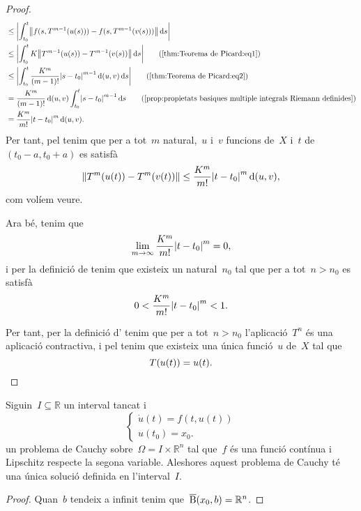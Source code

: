 \documentclass[../../main.tex]{subfiles}
\begin{document}
\begin{theorem}
\begin{proof}
\begin{align*}
                &\leq\abs{\int_{t_{0}}^{t}\norm{f(s,T^{m-1}(u(s)))-f(s,T^{m-1}(v(s)))}\diff s}\\
                &\leq\abs{\int_{t_{0}}^{t}K\norm{T^{m-1}(u(s))-T^{m-1}(v(s))}\diff s}\tag{\ref{thm:Teorema de Picard:eq1}}\\
                &\leq\abs{\int_{t_{0}}^{t}\frac{K^{m}}{(m-1)!}\abs{s-t_{0}}^{m-1}\distancia(u,v)\diff s}\tag{\ref{thm:Teorema de Picard:eq2}}\\
                &=\frac{K^{m}}{(m-1)!}\distancia(u,v)\int_{t_{0}}^{t}\abs{s-t_{0}}^{m-1}\diff s\tag{\ref{prop:propietats basiques multiple integrals Riemann definides}}\\
                &=\frac{K^{m}}{m!}\abs{t-t_{0}}^{m}\distancia(u,v).%
            \end{align*}
            Per tant, pel  tenim que per a tot~\(m\) natural,~\(u\) i~\(v\) funcions de~\(X\) i~\(t\) de~\((t_{0}-a,t_{0}+a)\) es satisfà
            \[
                \norm{T^{m}(u(t))-T^{m}(v(t))}\leq\frac{K^{m}}{m!}\abs{t-t_{0}}^{m}\distancia(u,v),
            \]
            com volíem veure.

            Ara bé, tenim que
            \[
                \lim_{m\to\infty}\frac{K^{m}}{m!}\abs{t-t_{0}}^{m}=0,
            \]%
            i per la definició de  tenim que existeix un natural~\(n_{0}\) tal que per a tot~\(n>n_{0}\) es satisfà
            \[
                0<{\frac{K^{m}}{m!}\abs{t-t_{0}}^{m}}<1.
            \]

            Per tant, per la definició d' tenim que per a tot~\(n>n_{0}\) l'aplicació~\(T^{n}\) és una aplicació contractiva, i pel \corollari{}  tenim que existeix una única funció~\(u\) de~\(X\) tal que
            \[
                T(u(t))=u(t).\qedhere
            \]
        \end{proof}
    \end{theorem}
    \begin{corollary}
        \label{cor:Teorema de Picard}
        Siguin~\(I\subseteq\mathbb{R}\) un interval tancat i
        \[\begin{cases}
            \displaystyle \dot{u}(t)=f(t,u(t)) \\
            \displaystyle u(t_{0})=x_{0}.
        \end{cases}\]
        un problema de Cauchy sobre~\(\Omega=I\times\mathbb{R}^{n}\) tal que~\(f\) és una funció contínua i Lipschitz respecte la segona variable.
        Aleshores aquest problema de Cauchy té una única solució definida en l'interval~\(I\).
        \begin{proof}
            Quan~\(b\) tendeix a infinit tenim que~\(\overline{\operatorname{B}}(x_{0},b)=\mathbb{R}^{n}\).
        \end{proof}
    \end{corollary}
\end{document}
